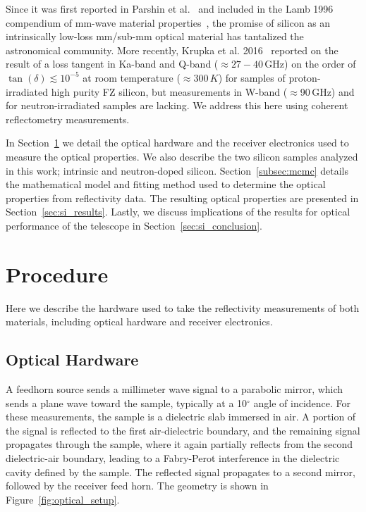 Since it was first reported in Parshin et al.~\cite{parshin} and included in the Lamb 1996 compendium of mm-wave material properties~\cite{lamb}, the promise of silicon as an intrinsically low-loss mm/sub-mm optical material has tantalized the astronomical community.   More recently, Krupka et al. 2016~\cite{KRUPKA201676} reported on the result of a loss tangent in Ka-band and Q-band ($\approx27-40$\,GHz) on the order of $\tan(\delta)\lesssim 10^{-5}$ at room temperature ($\approx300\,K$) for samples of proton-irradiated high purity FZ silicon, but measurements in W-band ($\approx$90\,GHz) and for neutron-irradiated samples are lacking. We address this here using coherent reflectometry measurements.

In Section~\ref{sec:si_procedure} we detail the optical hardware and the receiver electronics used to measure the optical properties.  We also describe the two silicon samples analyzed in this work; intrinsic and neutron-doped silicon.  Section~\ref{subsec:mcmc} details the mathematical model and fitting method used to determine the optical properties from reflectivity data.  The resulting optical properties are presented in Section~\ref{sec:si_results}.  Lastly, we discuss implications of the results for optical performance of the telescope in Section~\ref{sec:si_conclusion}.
\section{Procedure}
\label{sec:si_procedure}
Here we describe the hardware used to take the reflectivity measurements of both materials, including optical hardware and receiver electronics.
\subsection{Optical Hardware}
A feedhorn source sends a millimeter wave signal to a parabolic mirror, which sends a plane wave toward the sample, typically at a 10$^{\circ}$ angle of incidence. For these measurements, the sample is a dielectric slab immersed in air. A portion of the signal is reflected to the first air-dielectric boundary, and the remaining signal propagates through the sample, where it again partially reflects from the second dielectric-air boundary, leading to a Fabry-Perot interference in the dielectric cavity defined by the sample. The reflected signal propagates to a second mirror, followed by the receiver feed horn. The geometry is shown in Figure~\ref{fig:optical_setup}.

